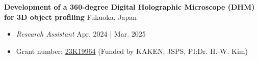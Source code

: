 \documentclass[a4paper,9pt]{extarticle}
\begin{document}
\noindent
\textbf{Development of a 360-degree Digital Holographic Microscope (DHM) for 3D object profiling} \hfill Fukuoka, Japan %
\begin{itemize}
    \item \textit{Research Assistant} \hfill Apr. 2024 | Mar. 2025 
    \item Grant number: \href{https://kaken.nii.ac.jp/en/grant/KAKENHI-PROJECT-23K19964/}{23K19964} (Funded by KAKEN, JSPS, PI:Dr. H.-W. Kim)    %
\end{itemize}
\end{document}
